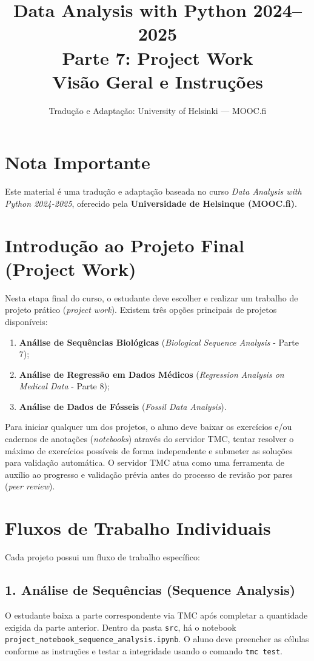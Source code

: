 \documentclass[11pt,a4paper]{article}
\title{\textbf{Data Analysis with Python 2024--2025}\\Parte 7: Project Work\\\large Visão Geral e Instruções}
\author{Tradução e Adaptação: University of Helsinki --- MOOC.fi}
\date{}
\begin{document}
\maketitle

\section*{Nota Importante}
Este material é uma tradução e adaptação baseada no curso \textit{Data Analysis with Python 2024-2025}, oferecido pela \textbf{Universidade de Helsinque (MOOC.fi)}.

\tableofcontents
\newpage

\section{Introdução ao Projeto Final (Project Work)}

Nesta etapa final do curso, o estudante deve escolher e realizar um trabalho de projeto prático (\emph{project work}). Existem três opções principais de projetos disponíveis:
\begin{enumerate}
    \item \textbf{Análise de Sequências Biológicas} (\textit{Biological Sequence Analysis} - Parte 7);
    \item \textbf{Análise de Regressão em Dados Médicos} (\textit{Regression Analysis on Medical Data} - Parte 8);
    \item \textbf{Análise de Dados de Fósseis} (\textit{Fossil Data Analysis}).
\end{enumerate}

Para iniciar qualquer um dos projetos, o aluno deve baixar os exercícios e/ou cadernos de anotações (\emph{notebooks}) através do servidor TMC, tentar resolver o máximo de exercícios possíveis de forma independente e submeter as soluções para validação automática. O servidor TMC atua como uma ferramenta de auxílio ao progresso e validação prévia antes do processo de revisão por pares (\emph{peer review}).

\section{Fluxos de Trabalho Individuais}

Cada projeto possui um fluxo de trabalho específico:

\subsection{1. Análise de Sequências (Sequence Analysis)}
O estudante baixa a parte correspondente via TMC após completar a quantidade exigida da parte anterior. Dentro da pasta \texttt{src}, há o notebook \texttt{project\_notebook\_sequence\_analysis.ipynb}. O aluno deve preencher as células conforme as instruções e testar a integridade usando o comando \texttt{tmc test}. 
\end{document}
